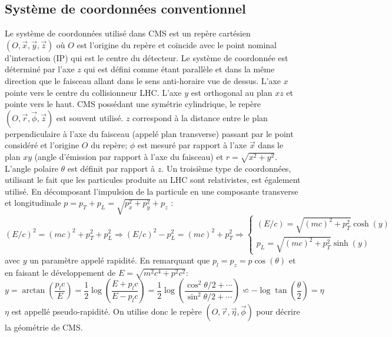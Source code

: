 \subsection{Système de coordonnées conventionnel}
Le système de coordonnées utilisé dans CMS est un repère cartésien $\left(O,\vec{x},\vec{y},\vec{z}\right)$ où $O$ est l'origine du repère et coïncide avec le point nominal d'interaction (IP) qui est le centre du détecteur. Le système de coordonnée est déterminé par l'axe $z$ qui est défini comme étant parallèle et dans la même direction que le faisceau allant dans le sens anti-horaire vue de dessus. L'axe $x$ pointe vers le centre du collisionneur LHC. L'axe $y$ est orthogonal au plan $xz$ et pointe vers le haut. CMS possédant une symétrie cylindrique, le repère $\left(O,\vec{r},\vec{\phi},\vec{z}\right)$ est souvent utilisé. $z$ correspond à la distance entre le plan perpendiculaire à l'axe du faisceau (appelé plan transverse) passant par le point considéré et l'origine $O$ du repère; $\phi$ est mesuré par rapport à l'axe $\vec{x}$ dans le plan $xy$ (angle d'émission par rapport à l'axe du faisceau) et $r=\sqrt{x^2+y^2}$. L'angle polaire $\theta$ est définit par rapport à $z$. Un troisième type de coordonnées, utilisant le fait que les particules produite au LHC sont relativistes, est également utilisé. En décomposant l'impulsion de la particule en une composante transverse et longitudinale $p=p_{T}+p_{L}=\sqrt{p_{x}^{2}+p_{y}^{2}}+p_{z}$ :
\begin{equation}
( E/c)^{2}=(mc)^{2}+p_{T}^{2}+p_{L}^{2}\Longrightarrow ( E/c)^{2}-p_{L}^{2}=(mc)^{2}+p_{T}^{2}\Longrightarrow  \begin{cases}
\left( E/c \right)=\sqrt{\left( mc \right)^{2}+p_{T}^{2}}\cosh(y) \\
p_{L}=\sqrt{\left( mc \right)^{2}+p_{T}^{2}}\sinh(y)
\end{cases}
\end{equation}
avec $y$ un paramètre appelé rapidité. En remarquant que $p_{l}=p_{z}=p\cos(\theta)$ et en faisant le développement de $E=\sqrt{m^{2}c^{4}+p^{2}c^{2}}$:
\begin{equation}
y=\arctan\left(\frac{p_{l}c}{E}\right)=\frac{1}{2}\log\left(\frac{E+p_{l}c}{E-p_{l}c}\right)=\frac{1}{2}\log\left(\frac{\cos^2 \theta/2+\cdots}{\sin^2 \theta/2+\cdots}\right)\backsimeq-\log\tan\left(\frac{\theta}{2}\right)=\eta
\end{equation}
$\eta$ est appellé pseudo-rapidité. On utilise donc le repère $\left(O,\vec{r},\vec{\eta},\vec{\phi}\right)$ pour décrire la géométrie de CMS.

